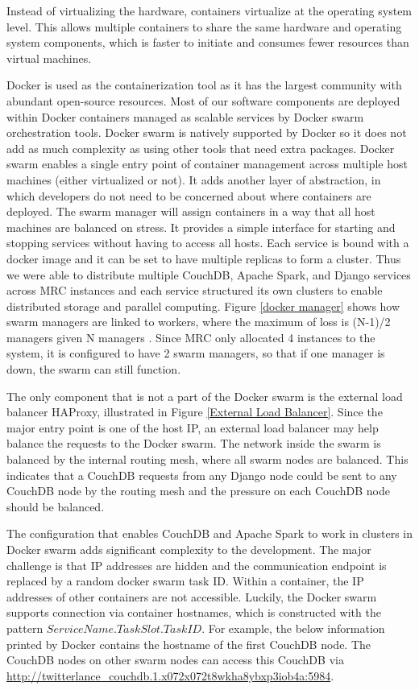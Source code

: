 Instead of virtualizing the hardware, containers virtualize at the operating system level. This allows multiple containers to share the same hardware and operating system components, which is faster to initiate and consumes fewer resources than virtual machines. 

Docker is used as the containerization tool as it has the largest community with abundant open-source resources. Most of our software components are deployed within Docker containers managed as scalable services by Docker swarm orchestration tools. Docker swarm is natively supported by Docker so it does not add as much complexity as using other tools that need extra packages. Docker swarm enables a single entry point of container management across multiple host machines (either virtualized or not). It adds another layer of abstraction, in which developers do not need to be concerned about where containers are deployed. The swarm manager will assign containers in a way that all host machines are balanced on stress. It provides a simple interface for starting and stopping services without having to access all hosts. Each service is bound with a docker image and it can be set to have multiple replicas to form a cluster. Thus we were able to distribute multiple CouchDB, Apache Spark, and Django services across MRC instances and each service structured its own clusters to enable distributed storage and parallel computing. Figure \ref{docker manager} shows how swarm managers are linked to workers, where the maximum of loss is (N-1)/2 managers given N managers \cite{offical_2021}. Since MRC only allocated 4 instances to the system, it is configured to have 2 swarm managers, so that if one manager is down, the swarm can still function. 


The only component that is not a part of the Docker swarm is the external load balancer HAProxy, illustrated in Figure \ref{External Load Balancer}. Since the major entry point is one of the host IP, an external load balancer may help balance the requests to the Docker swarm. The network inside the swarm is balanced by the internal routing mesh, where all swarm nodes are balanced. This indicates that a CouchDB requests from any Django node could be sent to any CouchDB node by the routing mesh and the pressure on each CouchDB node should be balanced.

The configuration that enables CouchDB and Apache Spark to work in clusters in Docker swarm adds significant complexity to the development. The major challenge is that IP addresses are hidden and the communication endpoint is replaced by a random docker swarm task ID. Within a container, the IP addresses of other containers are not accessible. Luckily, the Docker swarm supports connection via container hostnames, which is constructed with the pattern $ServiceName.TaskSlot.TaskID$. For example, the below information printed by Docker contains the hostname of the first CouchDB node. The CouchDB nodes on other swarm nodes can access this CouchDB via \url{http://twitterlance\_couchdb.1.x072x072t8wkha8ybxp3iob4a:5984}.

